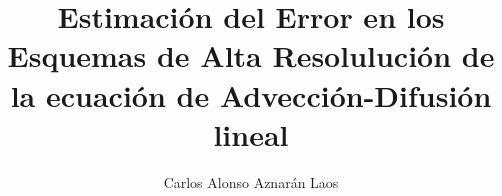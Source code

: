 \renewcommand{\cfttabpresnum}{Tabla N°}
\renewcommand{\cfttabnumwidth}{6.5 em}


\renewcommand{\thechapter}{\Roman{chapter}}
\renewcommand{\theequation}{\arabic{chapter}.\arabic{equation}}
\renewcommand{\thesection}{\arabic{chapter}.\arabic{section}}
\renewcommand{\thetable}{\arabic{chapter}.\arabic{table}}
\renewcommand{\thefigure}{\arabic{chapter}.\arabic{figure}}

\providecommand{\averageconcentration}{\overline{u}\left(x,t\right)}
\providecommand{\inner}[2]{\left\langle #1, #2 \right\rangle}


\theoremstyle{definition}
\newtheorem{theorem}{Teorema}
\newtheorem{definition}{Definición}
\newtheorem{example}{Ejemplo}
\newtheorem{proposition}{Proposición}


\author{Carlos Alonso Aznarán Laos}


\title{Estimación del Error en los Esquemas de Alta Resolulución de la ecuación de Advección-Difusión lineal}



